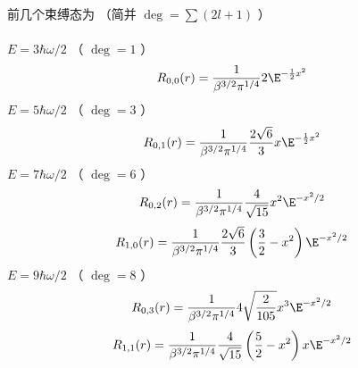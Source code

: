 前几个束缚态为 （简并 $\deg  = \sum {(2l + 1)} $ ）\\ \\
 $E = 3\hbar \omega /2$ （ $\deg  = 1$ ）
\begin{equation}
{R_{0,0}}(r) = \frac{1}{{{\beta ^{3/2}}{\pi ^{1/4}}}}2{\E^{ - \frac{1}{2}{x^2}}}
\end{equation}
 $E = 5\hbar \omega /2$ （ $\deg  = 3$ ）
\begin{equation}
{R_{0,1}}(r) = \frac{1}{{{\beta ^{3/2}}{\pi ^{1/4}}}}\frac{{2\sqrt 6 }}{3}x{\E^{ - \frac{1}{2}{x^2}}}
\end{equation}
 $E = 7\hbar \omega /2$ （ $\deg  = 6$ ）
\begin{equation}
{R_{0,2}}(r) = \frac{1}{{{\beta ^{3/2}}{\pi ^{1/4}}}}\frac{4}{{\sqrt {15} }}{x^2}{\E^{ - {x^2}/2}}
\end{equation}
\begin{equation}
{R_{1,0}}(r) = \frac{1}{{{\beta ^{3/2}}{\pi ^{1/4}}}}\frac{{2\sqrt 6 }}{3}\left( {\frac{3}{2} - {x^2}} \right){\E^{ - {x^2}/2}}
\end{equation}
 $E = 9\hbar \omega /2$ （ $\deg  = 8$ ）
\begin{equation}
 {R_{0,3}}(r) = \frac{1}{{{\beta ^{3/2}}{\pi ^{1/4}}}}4\sqrt {\frac{2}{{105}}} {x^3}{\E^{ - {x^2}/2}}
\end{equation}
\begin{equation}
{R_{1,1}}(r) = \frac{1}{{{\beta ^{3/2}}{\pi ^{1/4}}}}\frac{4}{{\sqrt {15} }}\left( {\frac{5}{2} - {x^2}} \right)x{\E^{ - {x^2}/2}}
\end{equation}

 
